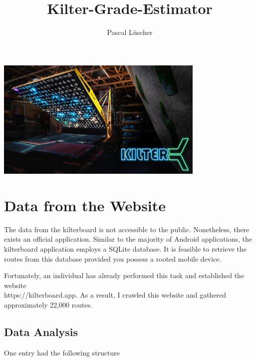 \documentclass{article}
\title{Kilter-Grade-Estimator}
\author{Pascal Lüscher}
\date{}
\begin{document}
\maketitle
\begin{center}
    \includegraphics[width=0.75\textwidth]{./media/KilterBoard.png}    
\end{center}


\section{Data from the Website}

The data from the kilterboard is not accessible to the public. Nonetheless, there exists an official application. Similar to the majority of Android applications, the kilterboard application employs a SQLite database. It is feasible to retrieve the routes from this database provided you possess a rooted mobile device.

Fortunately, an individual has already performed this task and established the website \\https://kilterboard.app. As a result, I crawled this website and gathered approximately 22,000 routes.


\subsection{Data Analysis}

One entry had the following structure
\end{document}

